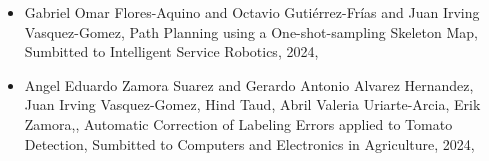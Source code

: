 \begin{itemize} 
\item Gabriel Omar Flores-Aquino and Octavio Gutiérrez-Frías and Juan Irving Vasquez-Gomez, Path Planning using a One-shot-sampling Skeleton Map, Sumbitted to Intelligent Service Robotics, 2024, \href{https://wwwjivg.org}{\faFilePdfO} 
\item Angel Eduardo Zamora Suarez and Gerardo Antonio Alvarez Hernandez, Juan Irving Vasquez-Gomez, Hind Taud,
Abril Valeria Uriarte-Arcia, Erik Zamora,, Automatic Correction of Labeling Errors applied to Tomato Detection, Sumbitted to Computers and Electronics in Agriculture, 2024, \href{https://wwwjivg.org}{\faFilePdfO} 
\end{itemize} 
